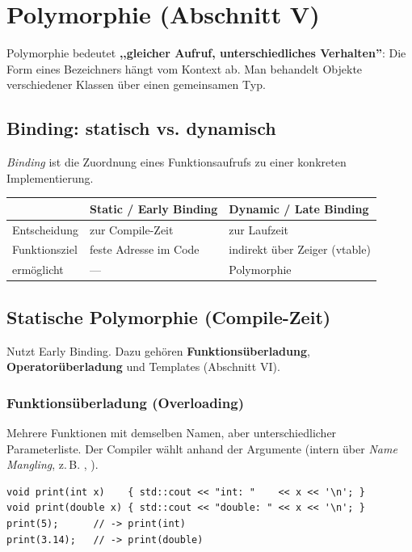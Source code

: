 \section{Polymorphie (Abschnitt V)}
\begin{definition}[: Polymorphie]
Polymorphie bedeutet \textbf{,,gleicher Aufruf, unterschiedliches Verhalten''}: Die Form eines Bezeichners h\"angt vom Kontext ab. Man behandelt Objekte verschiedener Klassen \"uber einen gemeinsamen Typ.
\end{definition}


\subsection{Binding: statisch vs. dynamisch}
\emph{Binding} ist die Zuordnung eines Funktionsaufrufs zu einer konkreten Implementierung.
\begin{center}\small
\begin{tabular}{@{}lll@{}}
\toprule
 & \textbf{Static / Early Binding} & \textbf{Dynamic / Late Binding} \\
\midrule
Entscheidung & zur Compile-Zeit & zur Laufzeit \\
Funktionsziel & feste Adresse im Code & indirekt \"uber Zeiger (vtable) \\
erm\"oglicht & --- & Polymorphie \\
\bottomrule
\end{tabular}
\end{center}

\subsection{Statische Polymorphie (Compile-Zeit)}
Nutzt Early Binding. Dazu geh\"oren \textbf{Funktions\"uberladung}, \textbf{Operator\"uberladung} und Templates (Abschnitt VI).

\subsubsection*{Funktions\"uberladung (Overloading)}
Mehrere Funktionen mit demselben Namen, aber unterschiedlicher Parameterliste. Der Compiler w\"ahlt anhand der Argumente (intern \"uber \emph{Name Mangling}, z.\,B. , ).
\begin{lstlisting}
void print(int x)    { std::cout << "int: "    << x << '\n'; }
void print(double x) { std::cout << "double: " << x << '\n'; }
print(5);      // -> print(int)
print(3.14);   // -> print(double)
\end{lstlisting}

